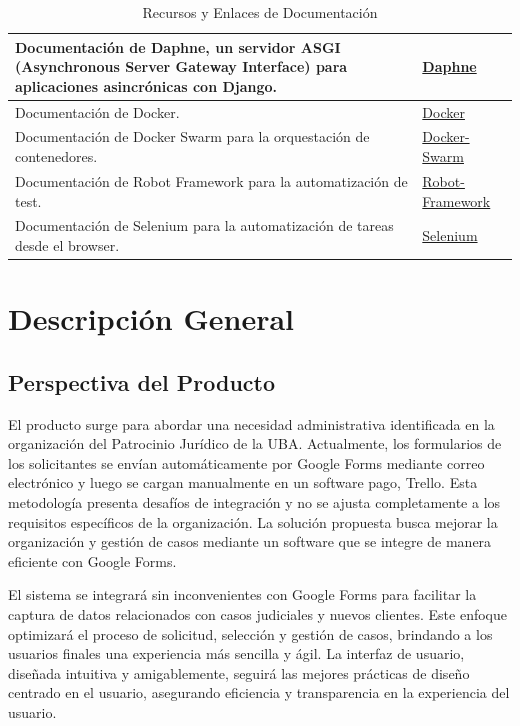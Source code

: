 \begin{table}[H]
\begin{tabular}{|p{11cm}|p{4cm}|}
        \hline
        Documentación de Daphne, un servidor ASGI (Asynchronous Server Gateway Interface) para aplicaciones asincrónicas con Django. & \href{https://docs.djangoproject.com/en/5.0/howto/deployment/asgi/daphne/}{Daphne}\\
        \hline
        Documentación de Docker. & \href{https://docs.docker.com/engine/}{Docker} \\
        \hline
        Documentación de Docker Swarm para la orquestación de contenedores. & \href{https://docs.docker.com/engine/swarm/}{Docker-Swarm}\\
        \hline
        Documentación de Robot Framework para la automatización de test. & \href{https://robotframework.org/robotframework/latest/RobotFrameworkUserGuide.html}{Robot-Framework}\\
        \hline
        Documentación de Selenium para la automatización de tareas desde el browser. & \href{https://robotframework.org/SeleniumLibrary/SeleniumLibrary.html}{Selenium}\\
        \hline
    \end{tabular}
    \caption{Recursos y Enlaces de Documentación}
    \label{tab:recursos_documentacion}
\end{table}



\newpage

\section{Descripción General}

\subsection{Perspectiva del Producto}
El producto surge para abordar una necesidad administrativa identificada en la organización del Patrocinio Jurídico de la UBA. Actualmente, los formularios de los solicitantes se envían automáticamente por Google Forms mediante correo electrónico y luego se cargan manualmente en un software pago, Trello. Esta metodología presenta desafíos de integración y no se ajusta completamente a los requisitos específicos de la organización. La solución propuesta busca mejorar la organización y gestión de casos mediante un software que se integre de manera eficiente con Google Forms.

El sistema se integrará sin inconvenientes con Google Forms para facilitar la captura de datos relacionados con casos judiciales y nuevos clientes. Este enfoque optimizará el proceso de solicitud, selección y gestión de casos, brindando a los usuarios finales una experiencia más sencilla y ágil. La interfaz de usuario, diseñada intuitiva y amigablemente, seguirá las mejores prácticas de diseño centrado en el usuario, asegurando eficiencia y transparencia en la experiencia del usuario.

